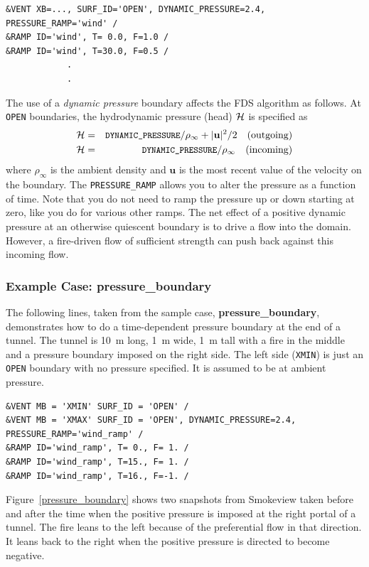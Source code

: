 \documentclass[11pt]{book}
\newcommand{\ct}{\tt\small}
\begin{document}
\footnotesize
\begin{verbatim}
&VENT XB=..., SURF_ID='OPEN', DYNAMIC_PRESSURE=2.4, PRESSURE_RAMP='wind' /
&RAMP ID='wind', T= 0.0, F=1.0 /
&RAMP ID='wind', T=30.0, F=0.5 /
            .
            .
\end{verbatim}
\normalsize

\noindent
The use of a {\em dynamic pressure} boundary affects the FDS algorithm as follows.  At {\ct OPEN} boundaries, the hydrodynamic pressure (head) $\cal H$ is specified as
\begin{eqnarray}
{\cal H} &=& \mbox{\ct DYNAMIC\_PRESSURE}/\rho_\infty + {|\mathbf{u}|^2}/2 \quad  \mbox{(outgoing)}  \nonumber \\
{\cal H} &=& \mbox{\ct DYNAMIC\_PRESSURE}/\rho_\infty \quad                       \mbox{(incoming)}
\end{eqnarray}
where $\rho_\infty$ is the ambient density and $\mathbf{u}$ is the most recent value of the velocity on the boundary.
The {\ct PRESSURE\_RAMP} allows you to alter the pressure as a function of time. Note that you do not
need to ramp the pressure up or down starting at zero, like you do for various other ramps.
The net effect of a positive dynamic pressure at an otherwise quiescent boundary is to
drive a flow into the domain. However, a fire-driven flow of sufficient strength can push back against this incoming flow.

\subsubsection{Example Case: {\bf pressure\_boundary}}

The following lines, taken from the sample case, {\bf pressure\_boundary}, demonstrates how to do
a time-dependent pressure boundary at the end of a tunnel. The tunnel is 10~m long, 1~m wide, 1~m tall
with a fire in the middle and a pressure boundary imposed on the right side. The left side ({\ct XMIN}) is
just an {\ct OPEN} boundary with no pressure specified. It is assumed to be at ambient pressure.

\footnotesize
\begin{verbatim}
&VENT MB = 'XMIN' SURF_ID = 'OPEN' /
&VENT MB = 'XMAX' SURF_ID = 'OPEN', DYNAMIC_PRESSURE=2.4, PRESSURE_RAMP='wind_ramp' /
&RAMP ID='wind_ramp', T= 0., F= 1. /
&RAMP ID='wind_ramp', T=15., F= 1. /
&RAMP ID='wind_ramp', T=16., F=-1. /
\end{verbatim}\normalsize

\noindent
Figure~\ref{pressure_boundary} shows two snapshots from Smokeview taken before and after the time when the positive pressure is
imposed at the right portal of a tunnel. The fire leans to the
left because of the preferential flow in that direction. It leans back to the right when the positive pressure
is directed to become negative.
\end{document}
